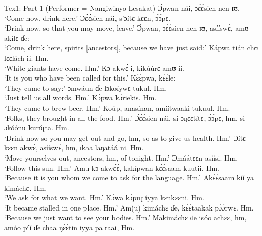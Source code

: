 \documentclass[output=paper,colorlinks,citecolor=brown]{langscibook}
\begin{document}

\ea Tex1: Part 1 (Performer = Nangiwinyo Lesakat)
    \ea    Ɔ́pwan nái, ɔɛ́ɛ́sien nen ɪʊ.\\
            `Come now, drink here.'
    \ex     Ɔɛ́ɛ́sien nái, s’ɔítɛ kɛɛn, ɔ́ɔ́pɛ. \\
            `Drink now, so that you may move, leave.'
    \ex     Ɔ́pwan, ɔɛ́ɛ́sien nen ɪʊ, asííswɛ́, amʊ akílɛ ɗe:\\
            `Come, drink here, spirits [ancestors], because we have just said:'
    \ex     Kápwa tián chʊ lɛɛlách ii. Hm.\\
            `White giants have come. Hm.' 
    \ex     Kɔ akwɛ́ i, kikúúrɛ amʊ ii. \\
            `It is you who have been called for this.'
    \ex     Kɛ́ɛ́pwa, kɛ́ɛ́le:\\
            `They came to say:'
    \ex     ɔmwáun ɗe lɔkoíywɛ tukul. Hm. \\
            `Just tell us all words. Hm.'
    \ex     Kɔ́pwa kɔ́riekis. Hm.\\
            `They came to brew beer. Hm.'
    \ex     Koúp, anasínan, amíítwaaki tukuul. Hm. \\
            `Folks, they brought in all the food. Hm.'
    \ex     Ɔ́ɛ́ɛ́sien nái, si ɔŋɛɛtítɛ, ɔ́ɔ́pɛ, hm, si ɔkóónu kurúɽta. Hm.\\
            `Drink now so you may get out and go, hm, so as to give us health. Hm.'
    \ex     Ɔítɛ kɛɛn akwɛ́, asííswɛ́, hm, ɪkaa laŋatáá ni. Hm. \\
            `Move yourselves out, ancestors, hm, of tonight. Hm.'
    \ex     Ɔmáátɛɛn asíísi. Hm.\\
            `Follow this sun. Hm.'
    \ex     Amu kɔ akwɛ́ɛ́, kakípwan kɛ́ɛ́saam kuutii. Hm.\\
            `Because it is you whom we come to ask for the language. Hm.'
    \ex     Akɛ́ɛ́saam kíí ya kimáchɛ. Hm.\\
            `We ask for what we want. Hm.'
    \ex     Kɔ́wa kɔ́puɽ íyya kɛnkɛɛni. Hm.\\
            `It became stalled in one place. Hm.'
    \ex     Am(u) kimáchɛ ɗe, kɛ́ɛ́taakak pɔ́ɔ́rwɛ. Hm.\\
            `Because we just want to see your bodies. Hm.'
    \ex     Makimáchɛ ɗe isóo achɛɛ, hm, amóo píí ɗe chaa ŋɛ́ɛ́tin iyya pa raai, Hm.\\
\end{document}
